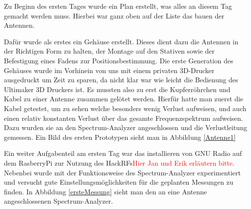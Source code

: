 \documentclass[titlepage,11pt,a4paper,ngerman]{article}
\begin{document}
Zu Beginn des ersten Tages wurde ein Plan erstellt, was alles an diesem Tag gemacht werden muss. Hierbei war ganz oben auf der Liste das bauen der Antennen.\par
Dafür wurde als erstes ein Gehäuse erstellt. Dieses dient dazu die Antennen in der Richtigen Form zu halten, der Montage auf den Stativen sowie der Befestigung eines Fadens zur Positionsbestimmung. Die erste Generation des Gehäuses wurde im Vorhinein von uns mit einem privaten 3D-Drucker ausgedruckt um Zeit zu sparen, da nicht klar war wie leicht die Bedienung des Ultimaker 3D Druckers ist. Es mussten also zu erst die Kupferröhrchen und Kabel zu einer Antenne zusammen gelötet werden. Hierfür hatte man zuerst die Kabel getestet, um zu sehen welche besonders wenig Verlust aufweisen, und auch einen relativ konstanten Verlust über das gesamte Frequenzspektrum aufweisen. Dazu wurden sie an den Spectrum-Analyzer angeschlossen und die Verlustleitung gemessen. Ein Bild des ersten Prototypen sieht man in Abbildung \ref{Antenne1}\par
Ein weiter Aufgabenteil am ersten Tag war das installieren von GNU Radio auf dem RasberryPi zur Nutzung des HackRFs\textcolor{red}{Hier Jan und Erik erläutern bitte}. Nebenbei wurde mit der Funktionsweise des Spectrum-Analyzer experimentiert und versucht gute Einstellungsmöglichkeiten für die geplanten Messungen zu finden. In Abbildung \ref{ersteMessung} sieht man den an eine Antenne angeschlossenen Spectrum-Analyzer. 
\end{document}
